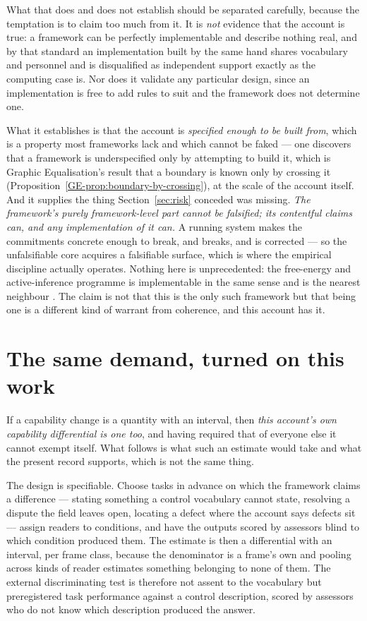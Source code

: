 \documentclass[11pt,a4paper]{article}
\begin{document}
What that does and does not establish should be separated carefully, because the temptation is to
claim too much from it. It is \emph{not} evidence that the account is true: a framework can be
perfectly implementable and describe nothing real, and by that standard an implementation
built by the same hand shares vocabulary and personnel and is disqualified as independent support
exactly as the computing case is. Nor does it validate any particular design, since an implementation
is free to add rules to suit and the framework does not determine one.

What it establishes is that the account is \emph{specified enough to be built from}, which is a
property most frameworks lack and which cannot be faked --- one discovers that a framework is
underspecified only by attempting to build it, which is Graphic Equalisation's result that a boundary is
known only by crossing it (Proposition~\ref{GE-prop:boundary-by-crossing}), at the scale of the
account itself. And it supplies the thing Section~\ref{sec:risk} conceded was
missing. \emph{The framework's purely framework-level part cannot be falsified; its contentful claims can, and any implementation of it can.} A running system makes
the commitments concrete enough to break, and breaks, and is corrected --- so the unfalsifiable core
acquires a falsifiable surface, which is where the empirical discipline actually operates. Nothing here
is unprecedented: the free-energy and active-inference programme is implementable in the same sense and
is the nearest neighbour \citep{friston2010}. The claim is not that this is the only such framework but
that being one is a different kind of warrant from coherence, and this account has it.

\section{The same demand, turned on this work}\label{sec:turned}
If a capability change is a quantity with an
interval, then \emph{this account's own capability differential is one too}, and having required that
of everyone else it cannot exempt itself. What follows is what such an estimate would take and what the
present record supports, which is not the same thing.

The design is specifiable. Choose tasks in advance on which the framework claims a difference ---
stating something a control vocabulary cannot state, resolving a dispute the field leaves open,
locating a defect where the account says defects sit --- assign readers to conditions, and have the
outputs scored by assessors blind to which condition produced them. The estimate is then a differential
with an interval, per frame class, because the denominator is a frame's own and pooling across kinds of
reader estimates something belonging to none of them. The external discriminating test is therefore
not assent to the vocabulary but preregistered task performance against a control description, scored
by assessors who do not know which description produced the answer.
\end{document}
